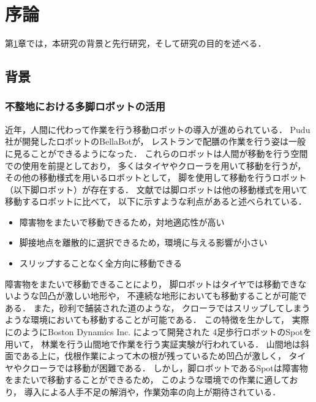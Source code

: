 ﻿
\chapter{序論}\label{chapter:序論}
第\ref{chapter:序論}章では，本研究の背景と先行研究，そして研究の目的を述べる．


\section{背景}


\subsection{不整地における多脚ロボットの活用}
近年，人間に代わって作業を行う移動ロボットの導入が進められている\cite{Sotnik_Prospects_for_Introduction}．
Pudu社が開発したロボットのBellaBot\cite{Pudu_BellaBot}が，
レストランで配膳の作業を行う姿は一般に見ることができるようになった．
これらのロボットは人間が移動を行う空間での使用を前提としており，
多くはタイヤやクローラを用いて移動を行うが，
その他の移動様式を用いるロボットとして，
脚を使用して移動を行うロボット（以下脚ロボット）が存在する．
文献\cite{Locomotion_for_difficult_terrain}では脚ロボットは他の移動様式を用いて移動するロボットに比べて，
以下に示すような利点があると述べられている．

\begin{itemize}
  \item 障害物をまたいで移動できるため，対地適応性が高い
  \item 脚接地点を離散的に選択できるため，環境に与える影響が小さい
  \item スリップすることなく全方向に移動できる
\end{itemize}

障害物をまたいで移動できることにより，
脚ロボットはタイヤでは移動できないような凹凸が激しい地形や，
不連続な地形においても移動することが可能である．
また，砂利で舗装された道のような，
クローラではスリップしてしまうような環境においても移動することが可能である．
この特徴を生かして，
実際にのようにBoston Dynamics Inc. によって開発された
4足歩行ロボットのSpot\cite{Boston_Dynamics_Spot}を用いて，
林業を行う山間地で作業を行う実証実験が行われている\cite{NEDO}．
山間地は斜面である上に，伐根作業によって木の根が残っているため凹凸が激しく，
タイヤやクローラでは移動が困難である．
しかし，脚ロボットであるSpotは障害物をまたいで移動することができるため，
このような環境での作業に適しており，
導入による人手不足の解消や，作業効率の向上が期待されている．

